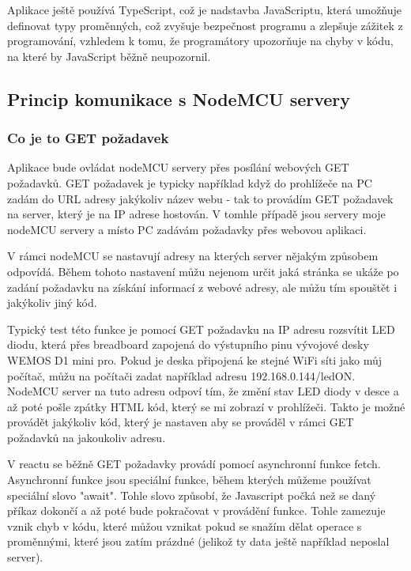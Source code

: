 Aplikace ještě používá TypeScript, což je nadstavba JavaScriptu, která umožňuje definovat typy proměnných, což zvyšuje bezpečnost programu a zlepšuje zážitek z programování, vzhledem k tomu, že programátory upozorňuje na chyby v kódu, na které by JavaScript běžně neupozornil.

\subsection{Princip komunikace s NodeMCU servery}


\subsubsection{Co je to GET požadavek }

Aplikace bude ovládat nodeMCU servery přes posílání webových GET požadavků. GET požadavek je typicky například když do prohlížeče na PC zadám do URL adresy jakýkoliv název webu - tak to provádím GET požadavek na server, který je na IP adrese hostován. V tomhle případě jsou servery moje nodeMCU servery a místo PC zadávám požadavky přes webovou aplikaci.

V rámci nodeMCU se nastavují adresy na kterých server nějakým způsobem odpovídá. Během tohoto nastavení můžu nejenom určit jaká stránka se ukáže po zadání požadavku na získání informací z webové adresy, ale můžu tím spouštět i jakýkoliv jiný kód.

Typický test této funkce je pomocí GET požadavku na IP adresu rozsvítit LED diodu, která přes breadboard zapojená do výstupního pinu vývojové desky WEMOS D1 mini pro. Pokud je deska připojená ke stejné WiFi síti jako můj počítač, můžu na počítači zadat například adresu 192.168.0.144/ledON. NodeMCU server na tuto adresu odpoví tím, že změní stav LED diody v desce a až poté pošle zpátky HTML kód, který se mi zobrazí v prohlížeči. Takto je možné provádět jakýkoliv kód, který je nastaven aby se prováděl v rámci GET požadavků na jakoukoliv adresu.

V reactu se běžně GET požadavky provádí pomocí asynchronní funkce fetch. Asynchronní funkce jsou speciální funkce, během kterých můžeme používat speciální slovo "await". Tohle slovo způsobí, že Javascript počká než se daný příkaz dokončí a až poté bude pokračovat v provádění funkce. Tohle zamezuje vznik chyb v kódu, které můžou vznikat pokud se snažím dělat operace s proměnnými, které jsou zatím prázdné (jelikož ty data ještě například neposlal server).

